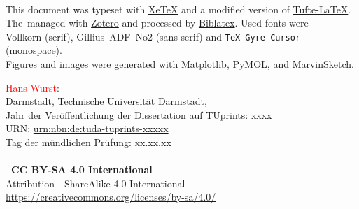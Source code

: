 \maketitle

\newpage
\pagestyle{empty}
~\vfill

\begin{fullwidth}
\begin{flushleft}
This document was typeset with \href{http://xetex.sourceforge.net/}{Xe\TeX}
and a modified version of \href{https://tufte-latex.github.io/tufte-latex}{Tufte-LaTeX}.
The\ managed with \href{https://www.zotero.org}{Zotero}
and processed by \href{https://github.com/plk/biblatex}{Biblatex}.
Used fonts were\\Vollkorn (serif), \textsf{Gillius~ADF~No2} (sans serif) and \texttt{TeX~Gyre~Cursor} (monospace).\\
Figures and images were generated with \href{https://matplotlib.org}{Matplotlib},
\href{https://pymol.org/2}{PyMOL}, and \href{https://chemaxon.com/products/marvin}{MarvinSketch}.

\textcolor{red}{Hans Wurst}: \plaintitle \\
Darmstadt, Technische Universit\"at Darmstadt,\\
Jahr der Ver\"offentlichung der Dissertation auf TUprints: xxxx\\
URN: \href{http://nbn-resolving.de/urn:nbn:de:tuda-tuprints-xxxxxx}{urn:nbn:de:tuda-tuprints-xxxxx}\\
Tag der m\"undlichen Pr\"ufung: xx.xx.xx\\
~\\
\textbf{\ccbysa~CC BY-SA 4.0 International} \\
Attribution - ShareAlike 4.0 International\\
\url{https://creativecommons.org/licenses/by-sa/4.0/}
\end{flushleft}
\end{fullwidth}



\newpage
\cleardoublepage